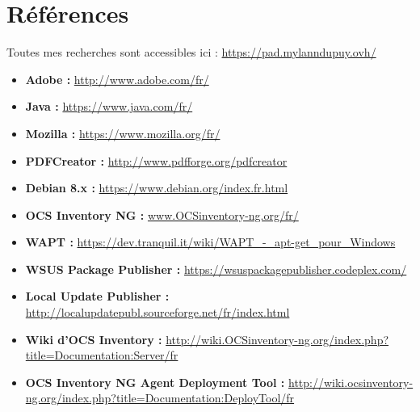 \documentclass[11pt,a4paper,oneside]{article}
\begin{document}
\section{Références}
Toutes mes recherches sont accessibles ici : \url {https://pad.mylanndupuy.ovh/}
\begin{itemize}
\item \textbf{Adobe :} \url {http://www.adobe.com/fr/} 
\item \textbf{Java :} \url {https://www.java.com/fr/}
\item \textbf{Mozilla :} \url {https://www.mozilla.org/fr/}
\item \textbf{PDFCreator :} \url {http://www.pdfforge.org/pdfcreator}
\item \textbf{Debian 8.x :} \url {https://www.debian.org/index.fr.html} 
\item \textbf{OCS Inventory NG :} \url {www.OCSinventory-ng.org/fr/}
\item \textbf{WAPT :} \url {https://dev.tranquil.it/wiki/WAPT_-_apt-get_pour_Windows}
\item \textbf{WSUS Package Publisher :} \url {https://wsuspackagepublisher.codeplex.com/}
\item \textbf{Local Update Publisher :} \url {http://localupdatepubl.sourceforge.net/fr/index.html}
\item \textbf{Wiki d'OCS Inventory :} \url{http://wiki.OCSinventory-ng.org/index.php?title=Documentation:Server/fr}
\item \textbf{OCS Inventory NG Agent Deployment Tool :} \url {http://wiki.ocsinventory-ng.org/index.php?title=Documentation:DeployTool/fr}
\end{itemize}
\end{document}
